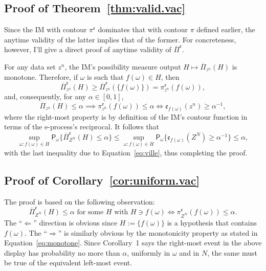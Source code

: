 \documentclass[a4paper, 12pt]{article}
\theoremstyle{plain}
\theoremstyle{definition}
\theoremstyle{remark}
\newcommand{\prob}{\mathsf{P}}
\newcommand{\uPi}{\overline{\Pi}}
\newcommand{\eval}{\mathfrak{e}}
\begin{document}
\subsection{Proof of Theorem~\ref{thm:valid.vac}}

Since the IM with contour $\pi^\eval$ dominates that with contour $\pi$ defined earlier, the anytime validity of the latter implies that of the former.  For concreteness, however, I'll give a direct proof of anytime validity of $\uPi^\eval$.  

For any data set $z^n$, the IM's possibility measure output $H \mapsto \uPi_{z^n}(H)$ is monotone.  Therefore, if $\omega$ is such that $f(\omega) \in H$, then 
\[ \uPi_{z^n}^\eval(H) \geq \uPi_{z^n}^\eval(\{ f(\omega) \}) = \pi_{z^n}^\eval(f(\omega)), \]
and, consequently, for any $\alpha \in [0,1]$, 
\[ \uPi_{z^n}(H) \leq \alpha \implies \pi_{z^n}^\eval(f(\omega)) \leq \alpha \iff \eval_{f(\omega)}(z^n) \geq \alpha^{-1}, \]
where the right-most property is by definition of the IM's contour function in terms of the e-process's reciprocal.  It follows that 
\[ \sup_{\omega: f(\omega) \in H} \prob_\omega\{ \uPi_{Z^N}^\eval(H) \leq \alpha \} \leq \sup_{\omega: f(\omega) \in H} \prob_\omega\{ \eval_{f(\omega)}(Z^N) \geq \alpha^{-1} \} \leq \alpha, \]
with the last inequality due to Equation~\eqref{eq:ville}, thus completing the proof.


\subsection{Proof of Corollary~\ref{cor:uniform.vac}}

The proof is based on the following observation:
\begin{equation}
\label{eq:equivalence} 
\uPi_{Z^N}^\eval(H) \leq \alpha \text{ for some $H$ with $H \ni f(\omega)$} \iff \pi_{Z^N}^\eval(f(\omega)) \leq \alpha. 
\end{equation}
The ``$\Longleftarrow$'' direction is obvious since $H := \{f(\omega)\}$ is a hypothesis that contains $f(\omega)$.  The ``$\Longrightarrow$'' is similarly obvious by the monotonicity property as stated in Equation~\eqref{eq:monotone}. Since Corollary~1 says the right-most event in the above display has probability no more than $\alpha$, uniformly in $\omega$ and in $N$, the same must be true of the equivalent left-most event.  
\end{document}

